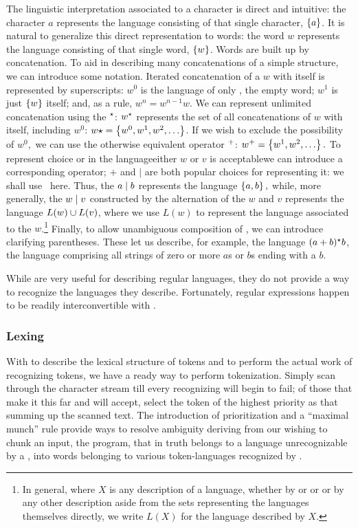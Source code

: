 The linguistic interpretation associated to a character is direct and intuitive: the character $a$ represents the language consisting of that single character, $\left\{ a \right\}$. It is natural to generalize this direct representation to words: the word $w$ represents the language consisting of that single word, $\left\{ w \right\}$. Words are built up by concatenation. To aid in describing many concatenations of a simple structure, we can introduce some notation. Iterated concatenation of a \regex $w$ with itself is represented by superscripts: $w^{0}$ is the language of only \emptyword, the empty word; $w^{1}$ is just $\left\{ w \right\}$ itself; and, as a rule, $w^{n} = w^{n-1}w$. We can represent unlimited concatenation using the  $^{\star}{}$: $w^{\star}{}$ represents the set of all concatenations of $w$ with itself, including $w^{0}$: $w\star = \set{w^{0}, w^{1}, w^{2}, \dotsc}$. If we wish to exclude the possibility of $w^{0},$ we can use the otherwise equivalent  operator $^{+}{}$: $w\posclos = \set{w^{1}, w^{2}, \dotsc}.$ To represent choice or  in the language\empause either \regex $w$ or \regex $v$ is acceptable\empause we can introduce a corresponding operator; $+$ and $\vert$ are both popular choices for representing it: we shall use \alt\ here. Thus, the \regex $a \mid b$ represents the language $\left\{ a, b \right\},$ while, more generally, the \regex $w \mid v$ constructed by the alternation of the \regexes $w$ and $v$ represents the language $L(w) \cup L(v)$, where we use $L(w)$ to represent the language associated to the \regex $w$.\footnote{In general, where $X$ is any description of a language, whether by \TM or \FA or \regex or by any other description aside from the sets representing the languages themselves directly, we write $L(X)$ for the language described by $X$.} Finally, to allow unambiguous composition of \regexes, we can introduce clarifying parentheses. These let us describe, for example, the language $(a + b)^{\star}{} b$, the language comprising all strings of zero or more $a$s or $b$s ending with a $b$.

While \regexes are very useful for describing regular languages, they do not provide a way to recognize the languages they describe. Fortunately, regular expressions happen to be readily interconvertible with \FAs.

\subsubsection{Lexing}
With \regexes to describe the lexical structure of tokens and \FAs to perform the actual work of recognizing tokens, we have a ready way to perform tokenization. Simply scan through the character stream till every recognizing \FA will begin to fail; of those that make it this far and will accept, select the token of the highest priority as that summing up the scanned text. The introduction of prioritization and a ``maximal munch'' rule provide ways to resolve ambiguity deriving from our wishing to chunk an input, the program, that in truth belongs to a language unrecognizable by a \FA{}, into words belonging to various token-languages recognized by \FAs.

